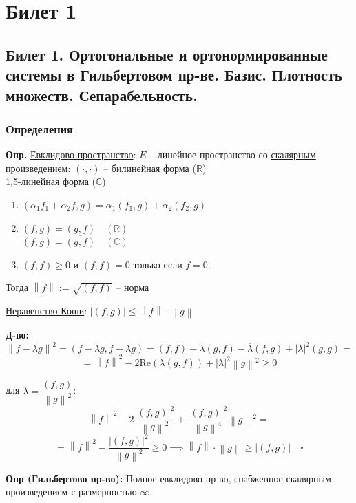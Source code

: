\documentclass[12pt,a4paper,openany]{book}
\newcommand{\norm}[1]{\left\lVert#1\right\rVert}
\begin{document}
\tableofcontents
\chapter{Билет 1} 
\section{Билет 1. Ортогональные и ортонормированные системы в Гильбертовом пр-ве. Базис. Плотность множеств. Сепарабельность.}
\subsection{Определения}

\noindent \textbf{Опр.} \underline{Евклидово пространство}: $E$ -- линейное пространство со \underline{скалярным произведением}: $(\cdot, \cdot)$ -- билинейная форма ($\mathbb{R}$)\\
\phantom{со скалярным произведением: $(\cdot, \cdot)$ -- } 1,5-линейная форма ($\mathbb{C}$)

\begin{enumerate}
    \item $(\alpha_1 f_1 + \alpha_2 f, g) = \alpha_1(f_1, g) + \alpha_2(f_2, g)$
    \item $(f, g) = (g, f) \quad (\mathbb{R})$ \\
          $(f, g) = \overline{(g, f)} \quad (\mathbb{C})$
    \item $(f, f) \ge 0$ и $(f, f) = 0$ только если $f = 0$.
\end{enumerate}

\bigskip

\noindent Тогда $\norm{f} := \sqrt{(f, f)}$ -- норма

\bigskip

\noindent \underline{Неравенство Коши}: $|(f, g)| \le \norm{f} \cdot \norm{g}$

\bigskip

\noindent \textbf{Д-во:}
$$
\norm{f - \lambda g}^2 = (f - \lambda g, f - \lambda g) = (f, f) - \lambda(g, f) - \overline{\lambda}(f, g) + |\lambda|^2(g, g) =
$$
$$
= \norm{f}^2 - 2\text{Re}(\lambda (g, f)) + |\lambda|^2 \norm{g}^2 \ge 0
$$

\noindent для $\lambda = \dfrac{(f, g)}{\norm{g}^2}$:
$$
\norm{f}^2 - 2 \dfrac{|(f, g)|^2}{\norm{g}^2} + \dfrac{|(f, g)|^2}{\norm{g}^4} \norm{g}^2 =
$$
$$
= \norm{f}^2 - \dfrac{|(f, g)|^2}{\norm{g}^2} \ge 0 \implies \norm{f} \cdot \norm{g} \ge |(f, g)| \quad \square
$$


\textbf{Опр (Гильбертово пр-во):}
Полное евклидово пр-во, снабженное скалярным произведением с размерностью $\infty$.
\end{document}
